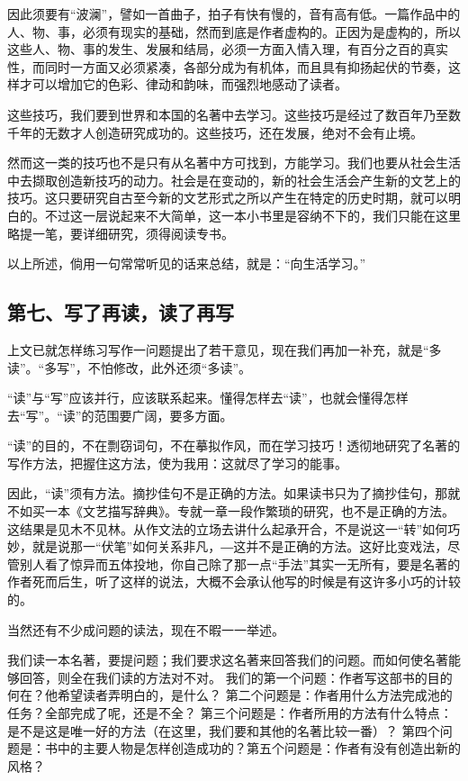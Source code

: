 \documentclass[fontset=fandol,12pt,a5paper]{ctexbook}
\begin{document}
因此须要有“波澜”，譬如一首曲子，拍子有快有慢的，音有高有低。一篇作品中的人、物、事，必须有现实的基础，然而到底是作者虚构的。正因为是虚构的，所以这些人、物、事的发生、发展和结局，必须一方面入情入理，有百分之百的真实性，而同时一方面又必须紧凑，各部分成为有机体，而且具有抑扬起伏的节奏，这样才可以增加它的色彩、律动和韵味，而强烈地感动了读者。

这些技巧，我们要到世界和本国的名著中去学习。这些技巧是经过了数百年乃至数千年的无数才人创造研究成功的。这些技巧，还在发展，绝对不会有止境。

然而这一类的技巧也不是只有从名著中方可找到，方能学习。我们也要从社会生活中去撷取创造新技巧的动力。社会是在变动的，新的社会生活会产生新的文艺上的技巧。这只要研究自古至今新的文艺形式之所以产生在特定的历史时期，就可以明白的。不过这一层说起来不大简单，这一本小书里是容纳不下的，我们只能在这里略提一笔，要详细研究，须得阅读专书。

以上所述，倘用一句常常听见的话来总结，就是：“向生活学习。”

\subsection{第七、写了再读，读了再写}
上文已就怎样练习写作一问题提出了若干意见，现在我们再加一补充，就是“多读”。“多写”，不怕修改，此外还须“多读”。

“读”与“写”应该并行，应该联系起来。懂得怎样去“读”，也就会懂得怎样去“写”。“读”的范围要广阔，要多方面。

“读”的目的，不在剽窃词句，不在摹拟作风，而在学习技巧！透彻地研究了名著的写作方法，把握住这方法，使为我用：这就尽了学习的能事。

因此，“读”须有方法。摘抄佳句不是正确的方法。如果读书只为了摘抄佳句，那就不如买一本《文艺描写辞典》。专就一章一段作繁琐的研究，也不是正确的方法。这结果是见木不见林。从作文法的立场去讲什么起承开合，不是说这一“转”如何巧妙，就是说那一“伏笔”如何关系非凡，―这并不是正确的方法。这好比变戏法，尽管别人看了惊异而五体投地，你自己除了那一点“手法”其实一无所有，要是名著的作者死而后生，听了这样的说法，大概不会承认他写的时候是有这许多小巧的计较的。

当然还有不少成问题的读法，现在不暇一一举述。

我们读一本名著，要提问题；我们要求这名著来回答我们的问题。而如何使名著能够回答，则全在我们读的方法对不对。
我们的第一个问题：作者写这部书的目的何在？他希望读者弄明白的，是什么？
第二个问题是：作者用什么方法完成池的任务？全部完成了呢，还是不全？
第三个问题是：作者所用的方法有什么特点：是不是这是唯一好的方法（在这里，我们要和其他的名著比较一番）？
第四个问题是：书中的主要人物是怎样创造成功的？第五个问题是：作者有没有创造出新的风格？
\end{document}
